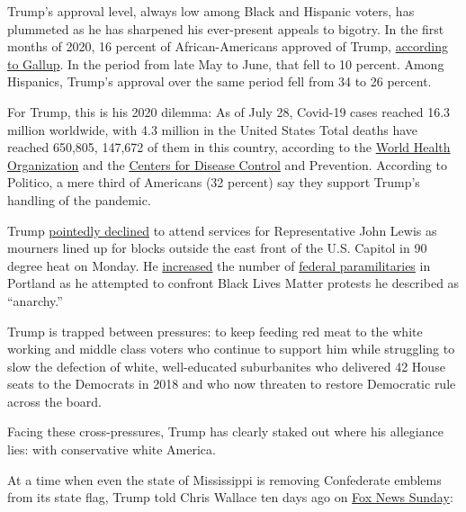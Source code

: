 Trump's approval level, always low among Black and Hispanic voters, has
plummeted as he has sharpened his ever-present appeals to bigotry. In
the first months of 2020, 16 percent of African-Americans approved of
Trump,
\href{https://news.gallup.com/poll/313454/trump-job-approval-rating-steady-lower-level.aspx}{according
to Gallup}. In the period from late May to June, that fell to 10
percent. Among Hispanics, Trump's approval over the same period fell
from 34 to 26 percent.

For Trump, this is his 2020 dilemma: As of July 28, Covid-19 cases
reached 16.3 million worldwide, with 4.3 million in the United States
Total deaths have reached 650,805, 147,672 of them in this country,
according to the
\href{https://www.who.int/docs/default-source/coronaviruse/situation-reports/20200727-covid-19-sitrep-189.pdf?sfvrsn=b93a6913_2}{World
Health Organization} and the
\href{https://www.cdc.gov/coronavirus/2019-ncov/cases-updates/cases-in-us.html}{Centers
for Disease Control} and Prevention. According to Politico, a mere third
of Americans (32 percent) say they support Trump's handling of the
pandemic.

Trump
\href{https://www.usatoday.com/story/news/politics/2020/07/27/trump-says-he-wont-pay-respects-john-lewis-he-lies-state/5520694002/}{pointedly
declined} to attend services for Representative John Lewis as mourners
lined up for blocks outside the east front of the U.S. Capitol in 90
degree heat on Monday. He
\href{https://www.washingtonpost.com/politics/more-federal-agents-dispatched-to-portland-as-protests-rise-in-other-cities/2020/07/27/20a717be-d03c-11ea-8d32-1ebf4e9d8e0d_story.html}{increased}
the number of
\href{https://www.theguardian.com/us-news/2020/jul/26/portland-federal-agents-teargas-protesters-black-lives-matter}{federal
paramilitaries} in Portland as he attempted to confront Black Lives
Matter protests he described as ``anarchy.''

Trump is trapped between pressures: to keep feeding red meat to the
white working and middle class voters who continue to support him while
struggling to slow the defection of white, well-educated suburbanites
who delivered 42 House seats to the Democrats in 2018 and who now
threaten to restore Democratic rule across the board.

Facing these cross-pressures, Trump has clearly staked out where his
allegiance lies: with conservative white America.

At a time when even the state of Mississippi is removing Confederate
emblems from its state flag, Trump told Chris Wallace ten days ago on
\href{https://www.foxnews.com/politics/transcript-fox-news-sunday-interview-with-president-trump}{Fox
News Sunday}:

